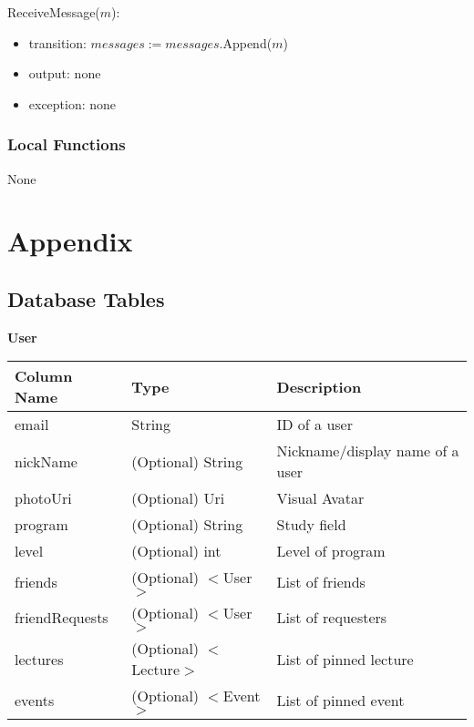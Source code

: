\documentclass[12pt, titlepage]{article}
\begin{document}
\noindent ReceiveMessage($m$):
\begin{itemize}
\item transition: $messages := messages$.Append($m$)
\item output: none
\item exception: none
\end{itemize}

\subsubsection{Local Functions}

None

\newpage

\section{Appendix} \label{Appendix}
\subsection{Database Tables}

\quad \textbf{User}
\begin{table}[H]
	\begin{tabular}{|p{}|p{}|p{}|}
		\hline
		\textbf{Column Name} & \textbf{Type}  & \textbf{Description}                  \\
		\hline
		email                   & String                & ID of a user                        \\
		\hline
		nickName           & (Optional) String                & Nickname/display name of a user      \\
		\hline
		photoUri           & (Optional) Uri                & Visual Avatar       \\
		\hline
		program            & (Optional) String                & Study field                \\
		\hline
		level             & (Optional) int                & Level of program                 \\
		\hline
		friends          &  (Optional) $<$User$>$                & List of friends \\
		\hline
		friendRequests          &  (Optional) $<$User$>$                & List of requesters              \\
		\hline
		lectures                & (Optional) $<$Lecture$>$                & List of pinned lecture                     \\
		\hline
		events                & (Optional) $<$Event$>$                & List of pinned event                     \\			
		\hline
\end{tabular}
\end{table}
\end{document}
